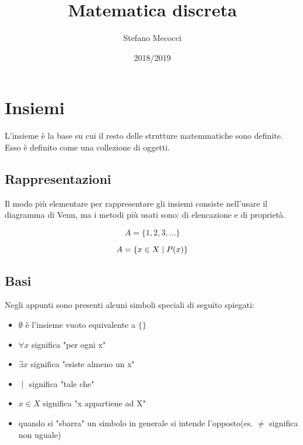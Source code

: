 \documentclass[12pt,a4paper]{article}
\title{Matematica discreta}
\author{Stefano Mecocci}
\date{2018/2019}
\newcommand{\Setsuchthat}{\;\ifnum\currentgrouptype=16 \middle\fi|\;} %
\begin{document}
  \maketitle
  \thispagestyle{empty}

  \newpage
  \tableofcontents
  \newpage

  \section{Insiemi}
  L'insieme è la base su cui il resto delle strutture matemmatiche sono definite. Esso è definito come una collezione di oggetti.

  \subsection{Rappresentazioni}
  Il modo più elementare per rappresentare gli insiemi consiste nell'usare il diagramma di Venn, ma i metodi più usati sono: di elencazione e di proprietà.

  \begin{equation}
    A = \{1, 2, 3, ...\}
  \end{equation}

  \begin{equation}
    A = \{x \in X \Setsuchthat P(x)\}
  \end{equation}

  \subsection{Basi}
  Negli appunti sono presenti alcuni simboli speciali di seguito spiegati:

  \begin{itemize}
    \item $ \emptyset $ è l'insieme vuoto equivalente a $ \{\} $
    \item $ \forall x $ significa "per ogni x"
    \item $ \exists x $ significa "esiste almeno un x"
    \item $ \Setsuchthat $ significa "tale che"
    \item $ x \in X $ significa "x appartiene ad X"
    \item quando si "sbarra" un simbolo in generale si intende l'opposto(es. $ \neq $ significa non uguale)
  \end{itemize}
\end{document}
